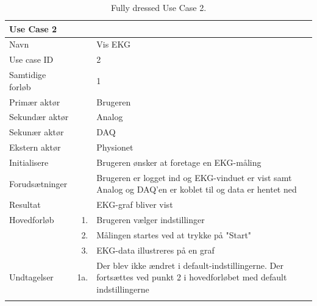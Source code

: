 \begin{longtabu} to  %
    {\large \textbf{Use Case 2}} && \\
    \toprule
    Navn &&    Vis EKG\\
    Use case ID &&    2\\
    Samtidige forløb &&    1\\
    Primær aktør &&    Brugeren\\
    Sekundær aktør &&	Analog\\
    Sekunær aktør &&	DAQ\\
    Ekstern aktør &&	Physionet\\
    Initialisere &&    Brugeren ønsker at foretage en EKG-måling\\
    Forudsætninger &&    Brugeren er logget ind og EKG-vinduet er vist samt Analog og DAQ'en er koblet til og data er hentet ned\\
    Resultat &&    EKG-graf bliver vist           \\ \midrule
    Hovedforløb &    1. &    Brugeren vælger indstillinger\\[-1ex]	
                &    2. &    Målingen startes ved at trykke på "Start"\\[-1ex]
                &    3. &    EKG-data illustreres på en graf\\ \midrule
                
    Undtagelser &    1a. &    Der blev ikke ændret i default-indstillingerne. Der fortsættes ved punkt 2 i hovedforløbet med default indstillingerne \\ \bottomrule
\caption{Fully dressed Use Case 2.}
\label{UC2}
\end{longtabu}


